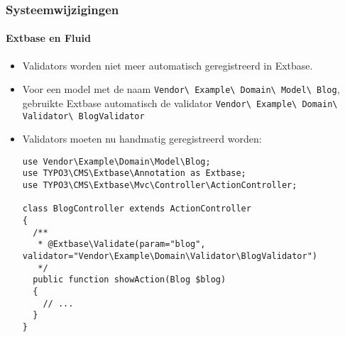 \begin{frame}[fragile]
	\frametitle{Systeemwijzigingen}
	\framesubtitle{Extbase en Fluid}

	\lstset{basicstyle=\tiny\ttfamily}

	\begin{itemize}
		\item Validators worden niet meer automatisch geregistreerd in Extbase.
		\item Voor een model met de naam
			\small\texttt{Vendor\textbackslash
				Example\textbackslash
				Domain\textbackslash
				Model\textbackslash
				Blog}\normalsize,\newline
			gebruikte Extbase automatisch de validator
			\small\texttt{Vendor\textbackslash
				Example\textbackslash
				Domain\textbackslash
				Validator\textbackslash
				BlogValidator}\normalsize

		\item Validators moeten nu handmatig geregistreerd worden:
\begin{lstlisting}
use Vendor\Example\Domain\Model\Blog;
use TYPO3\CMS\Extbase\Annotation as Extbase;
use TYPO3\CMS\Extbase\Mvc\Controller\ActionController;

class BlogController extends ActionController
{
  /**
   * @Extbase\Validate(param="blog", validator="Vendor\Example\Domain\Validator\BlogValidator")
   */
  public function showAction(Blog $blog)
  {
    // ...
  }
}
\end{lstlisting}

	\end{itemize}

\end{frame}


